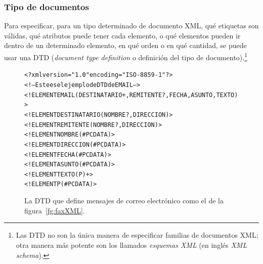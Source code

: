 \subsubsection{Tipo de documentos} Para especificar, para un tipo determinado de documento XML, qué etiquetas son válidas, qué atributos puede tener cada elemento, o qué elementos pueden ir dentro de un determinado elemento, en qué orden o en qué cantidad, se puede usar una DTD (\emph{document type definition} o definición del tipo de documento).\footnote{Las DTD no son la única manera de especificar familias de documentos XML; otra manera más potente son los llamados \emph{esquemas XML} (en inglés \emph{XML schema}).} 
\begin{figure}
\begin{center}
\begin{alltt}
<?xml version="1.0" encoding="ISO-8859-1"?>
<!-- Este es el ejemplo de DTD de EMAIL -->
<!ELEMENT EMAIL (DESTINATARIO+, REMITENTE?, FECHA, ASUNTO, TEXTO)>
<!ELEMENT DESTINATARIO (NOMBRE?, DIRECCION)>
<!ELEMENT REMITENTE (NOMBRE?, DIRECCION)>
<!ELEMENT NOMBRE (#PCDATA)>
<!ELEMENT DIRECCION (#PCDATA)>
<!ELEMENT FECHA (#PCDATA)>
<!ELEMENT ASUNTO (#PCDATA)>
<!ELEMENT TEXTO (P)+>
<!ELEMENT P (#PCDATA)>
\end{alltt}
\end{center}
\caption{La DTD que define mensajes de correo electrónico como el de
  la figura~\ref{fg:faxXML}.}
\label{fg:faxDTD}
\end{figure}

